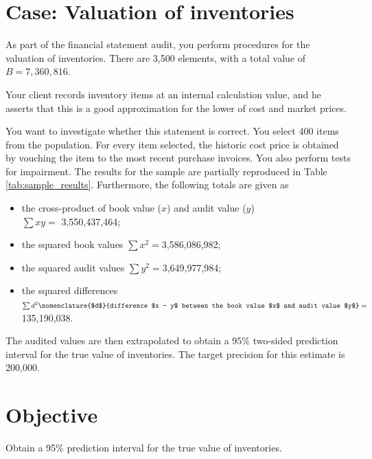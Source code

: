 \begin{mdframed}[hidealllines=true,backgroundcolor=KPMG_blue!10, innerleftmargin=0.3cm]
\section*{Case: Valuation of inventories}
As part of the financial statement audit, you perform procedures for the valuation of inventories. There are 3,500 elements, with a total value of $B = 7,360,816$. 

Your client records inventory items at an internal calculation value, and he asserts that this is a good approximation for the lower of cost and market prices.

You want to investigate whether this statement is correct. You select 400 items from the population. For every item selected, the historic cost price is obtained by vouching the item to the most recent purchase invoices. You also perform tests for impairment. The results for the sample are partially reproduced in Table \ref{tab:sample_results}. Furthermore, the following totals are given as
\begin{itemize}
\item the cross-product of book value ($x$) and audit value ($y$)\\ $\sum x y = $ 3,550,437,464;
\item the squared book values $\sum x^2 = $3,586,086,982;
\item the squared audit values $\sum y^2 = $3,649,977,984;
\item the squared differences $\sum d^2\nomenclature{$d$}{difference $x - y$ between the book value $x$ and audit value $y$} = $135,190,038.
\end{itemize}

\bigskip
The audited values are then extrapolated to obtain a 95\% two-sided prediction interval for the true value of inventories. The target precision for this estimate is 200,000. 


\section* {Objective}
Obtain a 95\% prediction interval for the true value of inventories.

\end{mdframed}

